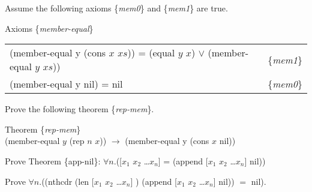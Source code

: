 \begin{ExerciseList}
\Exercise Assume the following axioms \{\emph{mem0}\} and \{\emph{mem1}\} are true.
\begin{samepage}
\label{member-equal-equations}
\begin{center}
Axioms \{\emph{member-equal}\} \\
\begin{tabular}{ll}
(member-equal y (cons $x$ $xs$)) = (equal $y$ $x$) $\vee$ (member-equal $y$ $xs$)) & \{\emph{mem1}\} \\
(member-equal y nil) = nil                                                         & \{\emph{mem0}\} \\
\end{tabular}
\end{center}
\end{samepage}
Prove the following theorem \{\emph{rep-mem}\}.
\begin{samepage}
\label{rep-mem}
\begin{center}
Theorem \{\emph{rep-mem}\} \\
(member-equal $y$ (rep $n$ $x$)) $\rightarrow$ (member-equal y (cons $x$ nil))
\end{center}
\end{samepage}

\Exercise {}
Prove Theorem \{app-nil\}: $\forall n.$([$x_1$ $x_2$ \dots $x_{n}$] = (append [$x_1$ $x_2$ \dots $x_{n}$] nil))

\Exercise Prove $\forall n.$((nthcdr (len [$x_1$ $x_2$ \dots $x_n$] ) (append [$x_1$ $x_2$ \dots $x_n$]  nil)) $=$ nil).

\end{ExerciseList}


